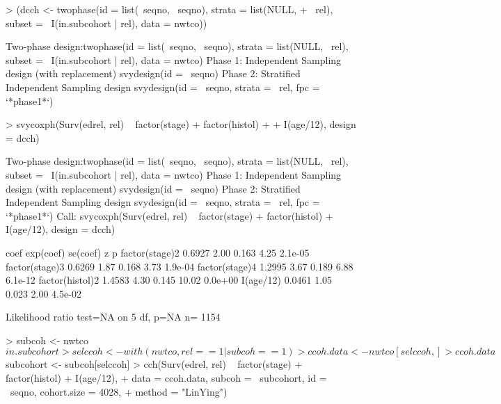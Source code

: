 \documentclass{article}
\begin{document}
\begin{Schunk}
\begin{Sinput}
> (dcch <- twophase(id = list(~seqno, ~seqno), strata = list(NULL, 
+     ~rel), subset = ~I(in.subcohort | rel), data = nwtco))
\end{Sinput}
\begin{Soutput}
Two-phase design:twophase(id = list(~seqno, ~seqno), strata = list(NULL, ~rel), 
    subset = ~I(in.subcohort | rel), data = nwtco)
Phase 1:
Independent Sampling design (with replacement)
svydesign(id = ~seqno)
Phase 2:
Stratified Independent Sampling design
svydesign(id = ~seqno, strata = ~rel, fpc = `*phase1*`)
\end{Soutput}
\begin{Sinput}
> svycoxph(Surv(edrel, rel) ~ factor(stage) + factor(histol) + 
+     I(age/12), design = dcch)
\end{Sinput}
\begin{Soutput}
Two-phase design:twophase(id = list(~seqno, ~seqno), strata = list(NULL, ~rel), 
    subset = ~I(in.subcohort | rel), data = nwtco)
Phase 1:
Independent Sampling design (with replacement)
svydesign(id = ~seqno)
Phase 2:
Stratified Independent Sampling design
svydesign(id = ~seqno, strata = ~rel, fpc = `*phase1*`)
Call:
svycoxph(Surv(edrel, rel) ~ factor(stage) + factor(histol) + 
    I(age/12), design = dcch)


                  coef exp(coef) se(coef)     z       p
factor(stage)2  0.6927      2.00    0.163  4.25 2.1e-05
factor(stage)3  0.6269      1.87    0.168  3.73 1.9e-04
factor(stage)4  1.2995      3.67    0.189  6.88 6.1e-12
factor(histol)2 1.4583      4.30    0.145 10.02 0.0e+00
I(age/12)       0.0461      1.05    0.023  2.00 4.5e-02

Likelihood ratio test=NA  on 5 df, p=NA  n= 1154 
\end{Soutput}
\begin{Sinput}
> subcoh <- nwtco$in.subcohort
> selccoh <- with(nwtco, rel == 1 | subcoh == 1)
> ccoh.data <- nwtco[selccoh, ]
> ccoh.data$subcohort <- subcoh[selccoh]
> cch(Surv(edrel, rel) ~ factor(stage) + factor(histol) + I(age/12), 
+     data = ccoh.data, subcoh = ~subcohort, id = ~seqno, cohort.size = 4028, 
+     method = "LinYing")
\end{Sinput}
\end{Schunk}
\end{document}
